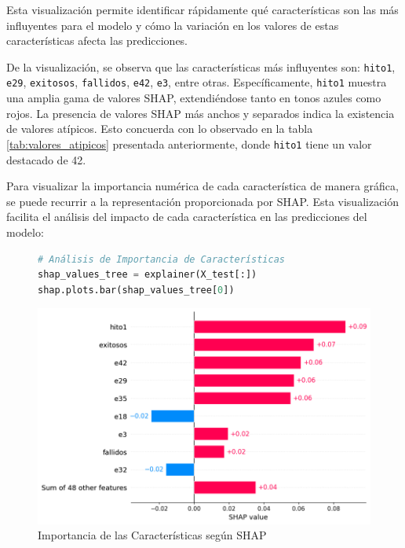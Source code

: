 Esta visualización permite identificar rápidamente qué características son las más influyentes para el modelo y cómo la variación en los valores de estas características afecta las predicciones.

De la visualización, se observa que las características más influyentes son: \texttt{hito1}, \texttt{e29}, \texttt{exitosos}, \texttt{fallidos}, \texttt{e42}, \texttt{e3}, entre otras. Específicamente, \texttt{hito1} muestra una amplia gama de valores SHAP, extendiéndose tanto en tonos azules como rojos. La presencia de valores SHAP más anchos y separados indica la existencia de valores atípicos. Esto concuerda con lo observado en la tabla \ref{tab:valores_atipicos} presentada anteriormente, donde \texttt{hito1} tiene un valor destacado de 42.

Para visualizar la importancia numérica de cada característica de manera gráfica, se puede recurrir a la representación proporcionada por SHAP. Esta visualización facilita el análisis del impacto de cada característica en las predicciones del modelo:

\begin{figure}[H]
    \centering
    \begin{minipage}{0.48\textwidth}
        \begin{lstlisting}[language=Python, caption=Análisis de Importancia de Características, label=lst:cod_calvaloreshap]
# Análisis de Importancia de Características
shap_values_tree = explainer(X_test[:])
shap.plots.bar(shap_values_tree[0])
        \end{lstlisting}
    \end{minipage}
    \hfill
    \begin{minipage}{0.48\textwidth}
        \centering
        \includegraphics[width=0.9\linewidth]{img/shap_rf/ImportanciaDeCaracteristicasShap.png}
        \caption{Importancia de las Características según SHAP}
        \label{fig:importancia_relativa_shap}
    \end{minipage}
\end{figure}

